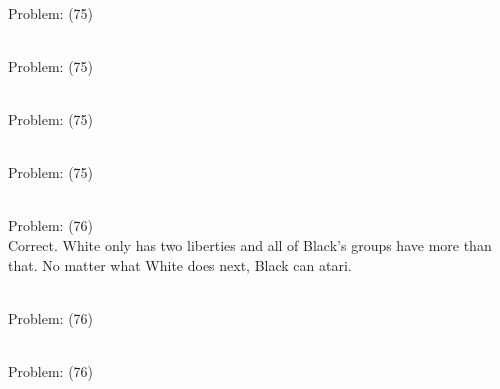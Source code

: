 \documentclass[11pt]{article}
\begin{document}
\begin{minipage}[t]{0.5\textwidth}
  {\centering
  
\\
Problem: (75)\\
  }
\end{minipage}
\begin{minipage}[t]{0.5\textwidth}
  {\centering
  
\\
Problem: (75)\\
  }
\end{minipage}
\begin{minipage}[t]{0.5\textwidth}
  {\centering
  
\\
Problem: (75)\\
  }
\end{minipage}
\begin{minipage}[t]{0.5\textwidth}
  {\centering
  
\\
Problem: (75)\\
  }
\end{minipage}
\begin{minipage}[t]{0.5\textwidth}
  {\centering
  
\\
Problem: (76)\\
Correct. White only has two liberties and all of Black's groups have more than that. No matter what White does next, Black can atari.\\
  }
\end{minipage}
\begin{minipage}[t]{0.5\textwidth}
  {\centering
  
\\
Problem: (76)\\
  }
\end{minipage}
\begin{minipage}[t]{0.5\textwidth}
  {\centering
  
\\
Problem: (76)\\
  }
\end{minipage}
\end{document}

